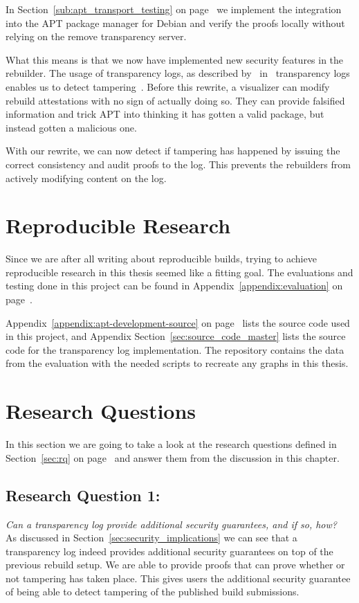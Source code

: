 \documentclass[../Main/thesis.tex]{subfiles}
\begin{document}
In Section~\ref{sub:apt_transport_testing} on
page~\pageref{sub:apt_transport_testing} we implement the integration into the
APT package manager for Debian and verify the proofs locally without relying on
the remove transparency server.

What this means is that we now have implemented new security features in the
rebuilder. The usage of transparency logs, as described by~\citeauthor{182788}
in~ transparency logs enables us to detect
tampering~\cite{182788}. Before this rewrite, a visualizer can modify rebuild
attestations with no sign of actually doing so. They can provide falsified
information and trick APT into thinking it has gotten a valid package, but
instead gotten a malicious one.

With our rewrite, we can now detect if tampering has happened by issuing the
correct consistency and audit proofs to the log. This prevents the rebuilders
from actively modifying content on the log.

\section{Reproducible Research}%
\label{sec:reproducible_research}
Since we are after all writing about reproducible builds, trying to achieve
reproducible research in this thesis seemed like a fitting goal. The evaluations
and testing done in this project can be found in
Appendix~\ref{appendix:evaluation} on page~\pageref{appendix:evaluation}.

Appendix~\ref{appendix:apt-development-source} on
page~\pageref{appendix:apt-development-source} lists the source code used in
this project, and Appendix Section~\ref{sec:source_code_master} lists the source
code for the transparency log implementation. The repository contains the data
from the evaluation with the needed scripts to recreate any graphs in this
thesis.

\section{Research Questions}%
\label{sec:research_questions}
In this section we are going to take a look at the research questions defined
in Section~\ref{sec:rq} on page~\pageref{sec:rq} and answer them from the
discussion in this chapter.

\subsection*{Research Question 1:}%
\label{sub:research_question_1_}
\textit{Can a transparency log provide additional security guarantees, and
if so, how?}\\
As discussed in Section~\ref{sec:security_implications} we can see that a
transparency log indeed provides additional security guarantees on top of the
previous rebuild setup. We are able to provide proofs that can prove whether or
not tampering has taken place. This gives users the additional security
guarantee of being able to detect tampering of the published build submissions.
\end{document}
